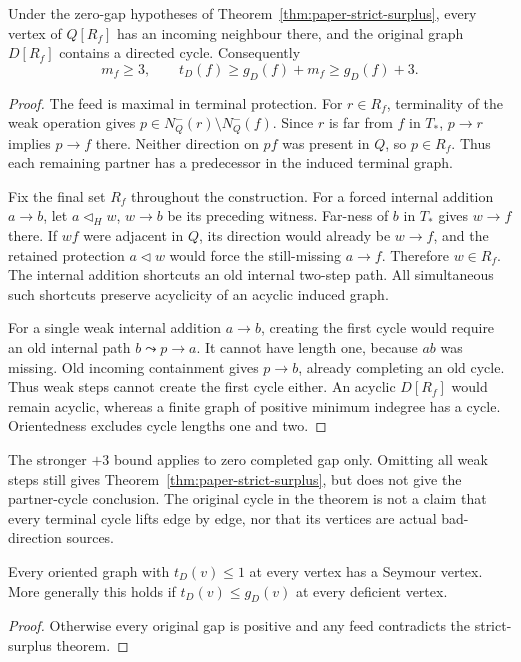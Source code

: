\begin{theorem}\label{thm:paper-original-cycle}
Under the zero-gap hypotheses of Theorem~\ref{thm:paper-strict-surplus},
every vertex of $Q[R_f]$ has an incoming neighbour there, and the original
graph $D[R_f]$ contains a directed cycle. Consequently
\[
 m_f\ge3,\qquad t_D(f)\ge g_D(f)+m_f\ge g_D(f)+3.
\]
\end{theorem}
\begin{proof}
The feed is maximal in terminal protection. For $r\in R_f$, terminality
of the weak operation gives $p\in N_Q^-(r)\setminus N_Q^-(f)$.
Since $r$ is far from $f$ in $T_*$, $p\to r$ implies $p\to f$ there.
Neither direction on $pf$ was present in $Q$, so $p\in R_f$. Thus each
remaining partner has a predecessor in the induced terminal graph.

Fix the final set $R_f$ throughout the construction. For a forced internal
addition $a\to b$, let $a\triangleleft_H w$, $w\to b$ be its preceding
witness. Far-ness of $b$ in $T_*$ gives $w\to f$ there. If $wf$ were adjacent
in $Q$, its direction would already be $w\to f$, and the retained protection
$a\triangleleft w$ would force the still-missing $a\to f$. Therefore
$w\in R_f$. The internal addition shortcuts an old internal two-step path.
All simultaneous such shortcuts preserve acyclicity of an acyclic induced
graph.

For a single weak internal addition $a\to b$, creating the first cycle
would require an old internal path $b\leadsto p\to a$. It cannot have length
one, because $ab$ was missing. Old incoming containment gives $p\to b$,
already completing an old cycle. Thus weak steps cannot create the first
cycle either. An acyclic $D[R_f]$ would remain acyclic, whereas a finite
graph of positive minimum indegree has a cycle. Orientedness excludes cycle
lengths one and two.
\end{proof}

The stronger $+3$ bound applies to zero completed gap only. Omitting all weak
steps still gives Theorem~\ref{thm:paper-strict-surplus}, but does not give
the partner-cycle conclusion. The original cycle in the theorem is not a
claim that every terminal cycle lifts edge by edge, nor that its vertices
are actual bad-direction sources.

\begin{corollary}\label{cor:paper-low-far}
Every oriented graph with $t_D(v)\le1$ at every vertex has a Seymour vertex.
More generally this holds if $t_D(v)\le g_D(v)$ at every deficient vertex.
\end{corollary}
\begin{proof}
Otherwise every original gap is positive and any feed contradicts the
strict-surplus theorem.
\end{proof}

